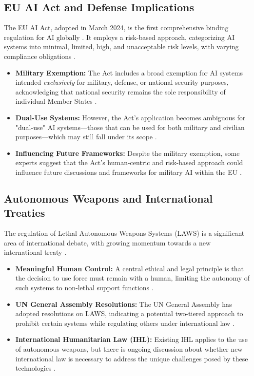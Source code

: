 \subsection{EU AI Act and Defense Implications}
The EU AI Act, adopted in March 2024, is the first comprehensive binding regulation for AI globally \cite{SierraTango_EU_AI_Act}. It employs a risk-based approach, categorizing AI systems into minimal, limited, high, and unacceptable risk levels, with varying compliance obligations \cite{Turing_EU_AI_Act}.
\begin{itemize}
    \item \textbf{Military Exemption:} The Act includes a broad exemption for AI systems intended \textit{exclusively} for military, defense, or national security purposes, acknowledging that national security remains the sole responsibility of individual Member States \cite{EuropaEU_EU_AI_Act, EncompassEurope_EU_AI_Act}. 
    \item \textbf{Dual-Use Systems:} However, the Act's application becomes ambiguous for "dual-use" AI systems—those that can be used for both military and civilian purposes—which may still fall under its scope \cite{TaylorWessing_EU_AI_Act}. 
    \item \textbf{Influencing Future Frameworks:} Despite the military exemption, some experts suggest that the Act's human-centric and risk-based approach could influence future discussions and frameworks for military AI within the EU \cite{EuropaEU_EU_AI_Act}. 
\end{itemize}

\subsection{Autonomous Weapons and International Treaties}
The regulation of Lethal Autonomous Weapons Systems (LAWS) is a significant area of international debate, with growing momentum towards a new international treaty \cite{ASIL_LAWS}.
\begin{itemize}
    \item \textbf{Meaningful Human Control:} A central ethical and legal principle is that the decision to use force must remain with a human, limiting the autonomy of such systems to non-lethal support functions \cite{HRW_LAWS, LawfareMedia_LAWS}. 
    \item \textbf{UN General Assembly Resolutions:} The UN General Assembly has adopted resolutions on LAWS, indicating a potential two-tiered approach to prohibit certain systems while regulating others under international law \cite{AutonomousWeapons_LAWS}. 
    \item \textbf{International Humanitarian Law (IHL):} Existing IHL applies to the use of autonomous weapons, but there is ongoing discussion about whether new international law is necessary to address the unique challenges posed by these technologies \cite{Case_LAWS}. 
\end{itemize}

